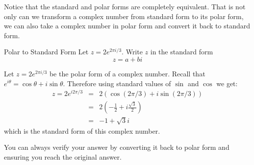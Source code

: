Notice that the standard and polar forms are completely equivalent. That is not only can we transform a complex number from standard form
to its polar form, we can also take a complex number in polar form and
convert it back to standard form.

\begin{example}{Polar to Standard Form}\label{exa:polarstandardform}
Let $z = 2 e^{ 2\pi i/3}$. Write $z$ in the standard form 
\begin{equation*}
z = a+bi
\end{equation*}
\end{example}

\begin{solution}
Let $z = 2 e^{2\pi i/3}$ be the polar form of a complex number. Recall that 
$e^{i\theta} = \cos \theta + i \sin \theta$. Therefore using standard values of $\sin$ and $\cos$ we get:
\begin{eqnarray*}
z = 2 e^{i 2\pi/3} &=& 2 (\cos (2\pi/3)+i\sin (2\pi/3))\\
&=& 2 \left ( -\frac{1}{2} + i \frac{\sqrt{3}}{2} \right) \\
&=&-1 + \sqrt{3}i 
\end{eqnarray*}
which is the standard form of this complex number.
\end{solution}

You can always verify your answer by converting it back to polar form and ensuring you reach the original answer. 